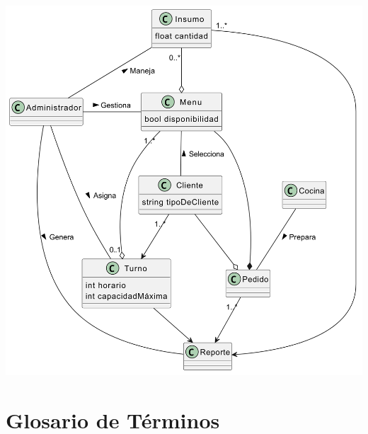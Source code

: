\documentclass[12pt]{article}
\begin{document}
\begin{center}
	\includegraphics[width=15cm]{Domain Modeling [01] - Class Diagram.png}
\end{center}

\pagebreak

\section{Glosario de Términos}
\end{document}
